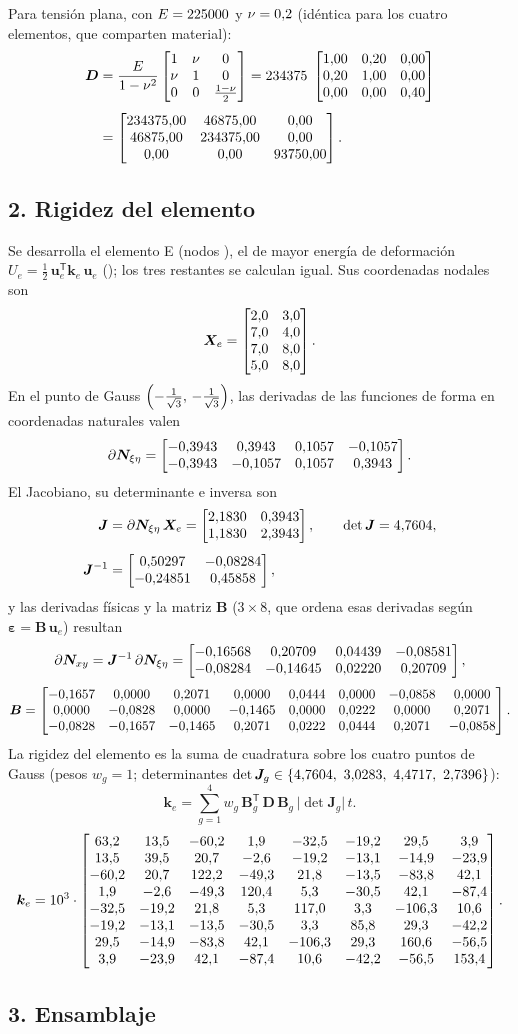 Para tensión plana, con $E=\valE$ y $\nu=\valNu$ (idéntica para los cuatro elementos, que comparten material):
\begin{align*}
\bm{D}&=\frac{E}{1-\nu^{2}}
\begin{bmatrix} 1 & \nu & 0 \\ \nu & 1 & 0 \\ 0 & 0 & \tfrac{1-\nu}{2} \end{bmatrix}
=\valDfactor\;\DmatNorm \\[0.4em]
&=\Dmat .
\end{align*}

\subsection*{2. Rigidez del elemento}

Se desarrolla el elemento E\showId{} (nodos \showNodes), el de mayor energía de deformación $U_e=\tfrac12\,\bm{u}_e^{\mathsf{T}}\bm{k}_e\,\bm{u}_e$ (\energiaInline); los tres restantes se calculan igual. Sus coordenadas nodales son
\[
\bm{X}_e=\Xemat .
\]
En el punto de Gauss $\gpA$, las derivadas de las funciones de forma en coordenadas naturales valen
\[
\partial\bm{N}_{\xi\eta}=\dNnatA .
\]
El Jacobiano, su determinante e inversa son
\begin{align*}
\bm{J}&=\partial\bm{N}_{\xi\eta}\,\bm{X}_e=\Jmata, \qquad
\det\bm{J}=\detJa, \\[0.4em]
\bm{J}^{-1}&=\invJa,
\end{align*}
y las derivadas físicas y la matriz $\bm{B}$ ($3\times 8$, que ordena esas derivadas según $\bm{\varepsilon}=\bm{B}\,\bm{u}_e$) resultan
\[
\partial\bm{N}_{xy}=\bm{J}^{-1}\,\partial\bm{N}_{\xi\eta}=\dNphysA ,
\]
{\footnotesize\setlength{\arraycolsep}{4pt}
\[
\bm{B}=\Bmata .
\]
}%
La rigidez del elemento es la suma de cuadratura sobre los cuatro puntos de Gauss (pesos $w_g=1$; determinantes $\det\bm{J}_g \in \{\detJinline\}$):
\[
\bm{k}_e=\sum_{g=1}^{4} w_g\,\bm{B}_g^{\mathsf{T}}\,\bm{D}\,\bm{B}_g\,\lvert\det\bm{J}_g\rvert\,t .
\]
{\footnotesize\setlength{\arraycolsep}{3.5pt}
\[
\bm{k}_e=\keScale\cdot\keMat .
\]
}%

\subsection*{3. Ensamblaje}

